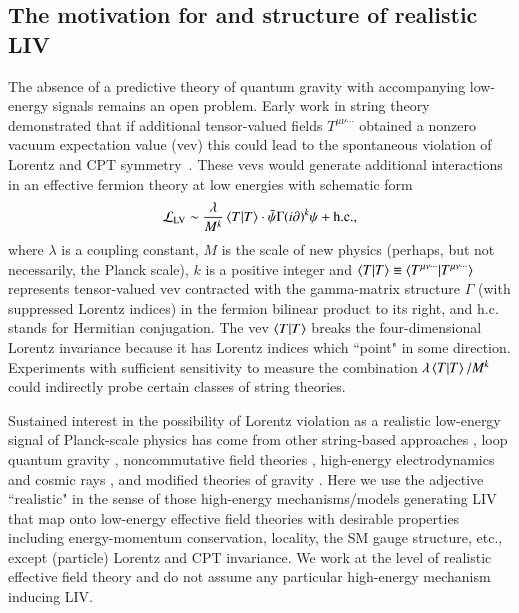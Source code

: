 \subsection{The motivation for and structure of realistic LIV}
\label{ssec:LV}
%
%
The absence of a predictive theory of quantum gravity
with accompanying low-energy signals
remains an open problem. Early work in
string theory demonstrated that 
if additional tensor-valued fields $T^{\mu\nu\cdots}$
obtained a nonzero vacuum expectation value (vev)
this could lead to the spontaneous violation of 
Lorentz and CPT symmetry~\cite{Kostelecky:1988zi,Kostelecky:1991ak}. 
These vevs would generate additional interactions
in an effective fermion theory at low energies 
with schematic form~\cite{Kostelecky:1991ak}
%
\begin{equation}
\label{lowE}
\mathcal{L}_{\text{LV}} \sim 
\frac{\lambda}{M^{k}}\braket{T}\cdot
\bar{\psi}\Gamma(i\partial)^{k}\psi+ \text{h.c.},
\end{equation}
%
where $\lambda$ is a coupling constant, 
$M$ is the scale of new physics 
(perhaps, but not necessarily, the Planck scale), $k$ is a positive 
integer and $\braket{T} \equiv \braket{T^{\mu\nu\cdots}}$ 
represents tensor-valued vev contracted with the gamma-matrix
structure $\Gamma$ (with suppressed Lorentz indices) in 
the fermion bilinear product to its right, and h.c. stands
for Hermitian conjugation. 
The vev $\braket{T}$ breaks the four-dimensional Lorentz
invariance because it has Lorentz indices 
which ``point" in some direction. 
Experiments with sufficient sensitivity to measure the 
combination $\lambda \braket{T}/M^k$ could 
indirectly probe certain classes of string theories.

Sustained interest in the possibility
of Lorentz violation as a realistic 
low-energy signal of Planck-scale
physics has come from other string-based approaches
\cite{Ellis:2008gg,Gliozzi:2011hj,Hashimoto:2012ig}, 
loop quantum gravity \cite{Gambini:2014kba,Rovelli:2010ed}, 
noncommutative field theories \cite{Carroll:2001ws,Carlson:2001sw,
Calmet:2004ii,Calmet:2004dn,Bailey:2018ifc}, 
high-energy electrodynamics and cosmic rays \cite{Carroll:1989vb, 
Coleman:1998ti}, and modified theories of gravity
\cite{Kostelecky:2020hbb,Kostelecky:2021xhb,
Kostelecky:2021tdf,deRham:2014zqa,Horava:2009uw,
Bluhm:2004ep,Bluhm:2007bd,Bluhm:2014oua}. Here we use
the adjective ``realistic" in the sense of those high-energy mechanisms/models
generating LIV that map onto low-energy effective field theories 
with desirable properties including energy-momentum conservation, 
locality, the SM gauge structure, etc., except 
(particle) Lorentz and CPT invariance. We work at the level of realistic
effective field theory and do not assume any particular 
high-energy mechanism inducing LIV.

